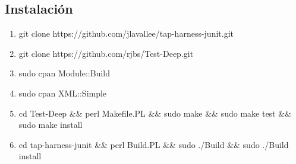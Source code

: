 \documentclass{article}
\begin{document}
\subsection{Instalación}
\begin{enumerate}
    \item git clone https://github.com/jlavallee/tap-harness-junit.git
    \item git clone https://github.com/rjbs/Test-Deep.git
    \item sudo cpan Module::Build
    \item sudo cpan XML::Simple
    \item cd Test-Deep \&\& perl Makefile.PL \&\& sudo make \&\& sudo make test \&\& sudo make install 
    \item cd tap-harness-junit \&\& perl Build.PL \&\& sudo ./Build \&\& sudo ./Build install
\end{enumerate}
\end{document}
